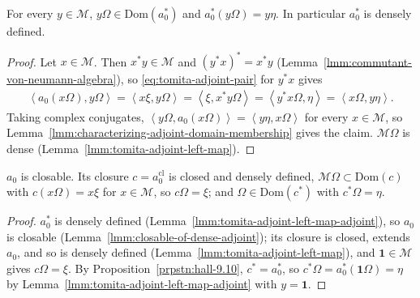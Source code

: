 \begin{lemma}
    \label{lmm:tomita-adjoint-left-map-adjoint}
    \leanok
    For every $y \in \mathcal{M}$, $y\Omega \in \text{Dom}(a_0^*)$ and $a_0^*(y\Omega) = y\eta$. In particular $a_0^*$ is densely defined.
\end{lemma}
\begin{proof}
    \leanok
    Let $x \in \mathcal{M}$. Then $x^*y \in \mathcal{M}$ and $(y^*x)^* = x^*y$ (Lemma~\ref{lmm:commutant-von-neumann-algebra}), so \eqref{eq:tomita-adjoint-pair} for $y^*x$ gives
    \begin{align}
        \left< a_0(x\Omega), y\Omega \right> = \left< x\xi, y\Omega \right> = \left< \xi, x^*y\Omega \right> = \left< y^*x\Omega, \eta \right> = \left< x\Omega, y\eta \right>.
    \end{align}
    Taking complex conjugates, $\left< y\Omega, a_0(x\Omega) \right> = \left< y\eta, x\Omega \right>$ for every $x \in \mathcal{M}$, so Lemma~\ref{lmm:characterizing-adjoint-domain-membership} gives the claim. $\mathcal{M}\Omega$ is dense (Lemma~\ref{lmm:tomita-adjoint-left-map}).
\end{proof}

\begin{lemma}
    \label{lmm:tomita-adjoint-closure-props}
    \leanok
    $a_0$ is closable. Its closure $c = a_0^{\text{cl}}$ is closed and densely defined, $\mathcal{M}\Omega \subset \text{Dom}(c)$ with $c(x\Omega) = x\xi$ for $x \in \mathcal{M}$, so $c\Omega = \xi$; and $\Omega \in \text{Dom}(c^*)$ with $c^*\Omega = \eta$.
\end{lemma}
\begin{proof}
    \leanok
    $a_0^*$ is densely defined (Lemma~\ref{lmm:tomita-adjoint-left-map-adjoint}), so $a_0$ is closable (Lemma~\ref{lmm:closable-of-dense-adjoint}); its closure is closed, extends $a_0$, and so is densely defined (Lemma~\ref{lmm:tomita-adjoint-left-map}), and $\mathbf{1} \in \mathcal{M}$ gives $c\Omega = \xi$. By Proposition~\ref{prpstn:hall-9.10}, $c^* = a_0^*$, so $c^*\Omega = a_0^*(\mathbf{1}\Omega) = \eta$ by Lemma~\ref{lmm:tomita-adjoint-left-map-adjoint} with $y = \mathbf{1}$.
\end{proof}

